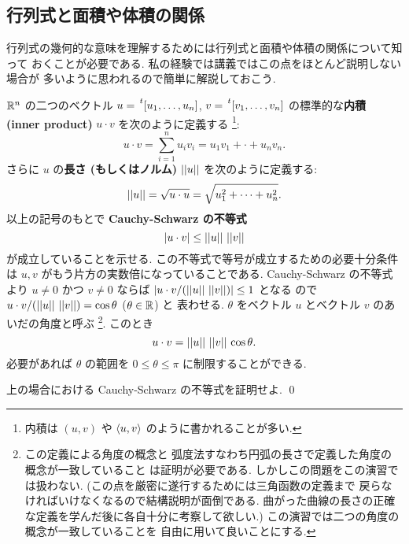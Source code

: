 \documentclass[12pt,twoside]{jarticle}
\begin{document}

\subsection{行列式と面積や体積の関係}
\label{sec:|det|=Vol}

行列式の幾何的な意味を理解するためには行列式と面積や体積の関係について知って
おくことが必要である.  私の経験では講義ではこの点をほとんど説明しない場合が
多いように思われるので簡単に解説しておこう.

\medskip

${\mathbb R}^n$ の二つのベクトル $u=\tp{[u_1,\ldots,u_n]}$, $v=\tp{[v_1,\ldots,v_n]}$ 
の標準的な{\bf 内積 (inner product)} $u\cdot v$ を次のように定義する%
\footnote{内積は $(u,v)$ や $\langle u,v\rangle$ のように書かれることが多い.}:
\begin{equation*}
  u\cdot v = \sum_{i=1}^n u_iv_i = u_1v_1+\cdot+u_nv_n.
\end{equation*}
さらに $u$ の{\bf 長さ (もしくはノルム)} $\left|\left|u\right|\right|$ を次のように定義する:
\begin{equation*}
  \left|\left|u\right|\right| = \sqrt{u\cdot u} = \sqrt{u_1^2+\cdots+u_n^2}.
\end{equation*}
以上の記号のもとで {\bf Cauchy-Schwarz の不等式}
\begin{equation*}
  |u\cdot v| \le \left|\left|u\right|\right|\,\left|\left|v\right|\right|
\end{equation*}
が成立していることを示せる.  この不等式で等号が成立するための必要十分条件
は $u,v$ がもう片方の実数倍になっていることである.
Cauchy-Schwarz の不等式より $u\ne 0$ かつ $v\ne 0$ 
ならば $|u\cdot v/(\left|\left|u\right|\right|\,\left|\left|v\right|\right|)|\le 1$ となる
ので $u\cdot v/(\left|\left|u\right|\right|\,\left|\left|v\right|\right|) = \cos\theta$ ($\theta\in{\mathbb R}$) と
表わせる. $\theta$ をベクトル $u$ とベクトル $v$ のあいだの角度と呼ぶ%
\footnote{この定義による角度の概念と
  弧度法すなわち円弧の長さで定義した角度の概念が一致していること
  は証明が必要である.  しかしこの問題をこの演習では扱わない.  
  (この点を厳密に遂行するためには三角函数の定義まで
  戻らなければいけなくなるので結構説明が面倒である.
  曲がった曲線の長さの正確な定義を学んだ後に各自十分に考察して欲しい.)
  この演習では二つの角度の概念が一致していることを
  自由に用いて良いことにする.}.
このとき
\begin{equation*}
  u\cdot v = \left|\left|u\right|\right|\,\left|\left|v\right|\right|\,\cos\theta.
\end{equation*}
必要があれば $\theta$ の範囲を $0\le\theta\le\pi$ に制限することができる.

\begin{question}
  \label{q:CS}
  上の場合における Cauchy-Schwarz の不等式を証明せよ. \qed
\end{question}
\end{document}
